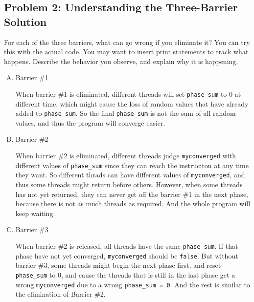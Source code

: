\documentclass[11pt]{article}
\newenvironment{choice}{\begin{enumerate}[A.]}{\end{enumerate}}
\newenvironment{answer}{\begin{minipage}[c][1.5in]{\textwidth}}{\end{minipage}}
\begin{document}
\newpage
\subsection*{Problem 2: Understanding the Three-Barrier Solution}

For each of the three barriers, what can go wrong if you eliminate it?
You can try this with the actual code.  You may want to insert print
statements to track what happens.  Describe the behavior you observe,
and explain why it is happening.

\begin{choice}
\item Barrier \#1

\begin{answer}
When barrier \#1 is eliminated, different threads will set \lstinline{phase_sum} to 0 at different time, which might cause the loss of random values that have already
added to \lstinline{phase_sum}. So the final \lstinline{phase_sum} is not the sum of all random values, and thus the program will converge easier. 
\end{answer}
\item Barrier \#2

\begin{answer}

When barrier \#2 is eliminated, different threads judge \lstinline{myconverged} with different values of \lstinline{phase_sum} since they can reach the instruciton
at any time they want. So different thrads can have different values of \lstinline{myconverged}, and thus some threads might return before others. However, when some threads has not yet returned, they can never get off the barrier \#1
in the next phase, because there is not as much threads as required. And the whole program will keep waiting. 

\end{answer}

\item Barrier \#3

\begin{answer}
When barrier \#2 is released, all threads have the same \lstinline{phase_sum}. If that phase have not yet converged, \lstinline{myconverged} should be \lstinline{false}. But without barrier \#3, some threads
might begin the next phase first, and reset \lstinline{phase_sum} to 0, and cause the threads that is still in the last phase get a wrong \lstinline{myconverged} due to a wrong \lstinline{phase_sum = 0}. And the rest is similar to the elimination of Barrier \#2. 
\end{answer}
\end{choice}
\end{document}
